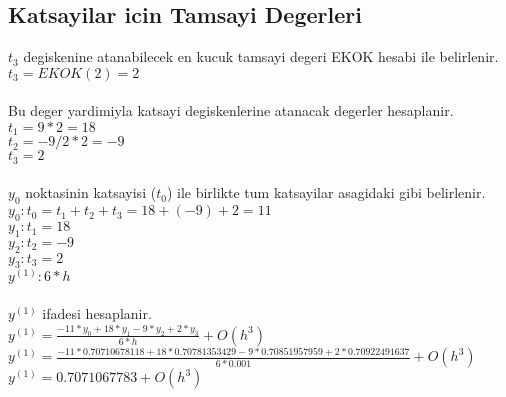 \documentclass{article}
\begin{document}
\subsection{Katsayilar icin Tamsayi Degerleri}
$t_{3}$ degiskenine atanabilecek en kucuk tamsayi degeri EKOK hesabi ile belirlenir.\\
$t_{3}=EKOK(2)=2$\\
\\
Bu deger yardimiyla katsayi degiskenlerine atanacak degerler hesaplanir.\\
$\displaystyle t_{1}=9*2=18$\\
$\displaystyle t_{2}=-9/2*2=-9$\\
$\displaystyle t_{3}=2$\\
\\
$y_{0}$ noktasinin katsayisi ($t_{0}$) ile birlikte tum katsayilar asagidaki gibi belirlenir.\\
$y_{0}: t_{0}=t_{1}+t_{2}+t_{3}=18+(-9)+2=11$\\
$y_{1}: t_{1}=18$\\
$y_{2}: t_{2}=-9$\\
$y_{3}: t_{3}=2$\\
$y^{(1)}: 6*h$\\
\\
$y^{(1)}$ ifadesi hesaplanir.\\
$y^{(1)}=\frac{-11*y_{0}+18*y_{1}-9*y_{2}+2*y_{3}}{6*h}+O(h^{3})$\\
$y^{(1)}=\frac{-11*0.70710678118+18*0.70781353429-9*0.70851957959+2*0.70922491637}{6*0.001}+O(h^{3})$\\
$y^{(1)}=0.7071067783+O(h^{3})$\\
\end{document}
